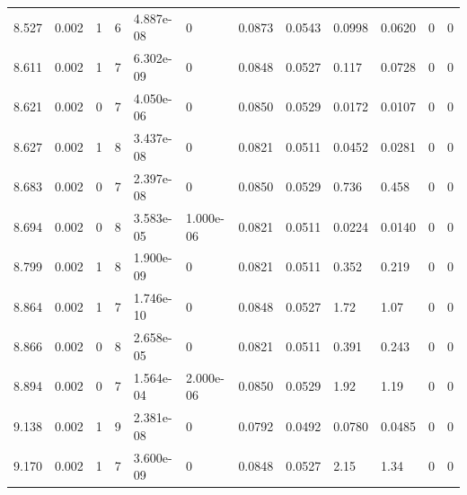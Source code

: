 \documentclass[preview]{standalone}
\begin{document}
{{{{{\begin{tabular}{L{1.2cm}C{1.2cm} C{0.3cm}C{0.5cm} C{1.4cm}C{1.4cm} C{1.4cm}C{1.4cm} C{1.6cm}C{1.6cm} C{1.6cm}C{1.6cm}}
  8.527  &  0.002  & 1     &  6 &  4.887e-08  & 0  &  0.0873&   0.0543& 0.0998 & 0.0620   &  0 & 0  \\ 
  8.611  &  0.002  & 1     &  7 &  6.302e-09  & 0  &  0.0848&   0.0527& 0.117 & 0.0728   &  0 & 0  \\ 
  8.621  &  0.002  & 0     &  7 &  4.050e-06  & 0  &  0.0850&   0.0529& 0.0172 & 0.0107   &  0 & 0  \\ 
  8.627  &  0.002  & 1     &  8 &  3.437e-08  & 0  &  0.0821&   0.0511& 0.0452 & 0.0281   &  0 & 0  \\ 
  8.683  &  0.002  & 0     &  7 &  2.397e-08  & 0  &  0.0850&   0.0529& 0.736 & 0.458   &  0 & 0  \\ 
  8.694  &  0.002  & 0     &  8 &  3.583e-05  & 1.000e-06  &  0.0821&   0.0511& 0.0224 & 0.0140   &  0 & 0  \\ 
  8.799  &  0.002  & 1     &  8 &  1.900e-09  & 0  &  0.0821&   0.0511& 0.352 & 0.219   &  0 & 0  \\ 
  8.864  &  0.002  & 1     &  7 &  1.746e-10  & 0  &  0.0848&   0.0527& 1.72 & 1.07   &  0 & 0  \\ 
  8.866  &  0.002  & 0     &  8 &  2.658e-05  & 0  &  0.0821&   0.0511& 0.391 & 0.243   &  0 & 0  \\ 
  8.894  &  0.002  & 0     &  7 &  1.564e-04  & 2.000e-06  &  0.0850&   0.0529& 1.92 & 1.19   &  0 & 0  \\ 
  9.138  &  0.002  & 1     &  9 &  2.381e-08  & 0  &  0.0792&   0.0492& 0.0780 & 0.0485   &  0 & 0  \\ 
  9.170  &  0.002  & 1     &  7 &  3.600e-09  & 0  &  0.0848&   0.0527& 2.15 & 1.34   &  0 & 0  \\ 
\hline 
\end{tabular} 

}}}}}
\end{document}
